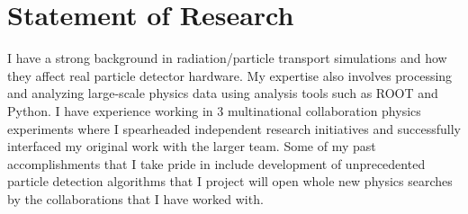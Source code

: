 \documentclass[11pt]{article} %
\begin{document}
%


\clearpage
\section{Statement of Research}

I have a strong background in radiation/particle transport simulations and how
they affect real particle detector hardware. My expertise also involves
processing and analyzing large-scale physics data using analysis tools such as
ROOT and Python. I have experience working in 3 multinational collaboration
physics experiments where I spearheaded independent research initiatives and
successfully interfaced my original work with the larger team. Some of my past
accomplishments that I take pride in include development of unprecedented
particle detection algorithms that I project will open whole new physics
searches by the collaborations that I have worked with.
\end{document}
